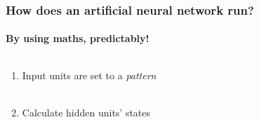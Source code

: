 \documentclass{beamer}
\begin{document}
\begin{frame}
\frametitle{How does an artificial neural network run?}
\framesubtitle{By using maths, predictably!}
  \begin{columns}[T]
    \begin{column}{.5\textwidth}
    \begin{enumerate}
\vfill
\item<1->{\textcolor{inputred}{Input units} are set to a \emph{pattern}} \\ \ \\
\item<3->{Calculate \textcolor{hiddenblue}{hidden units}' states}


\end{enumerate}
\end{column}
\end{columns}
\end{frame}
\end{document}
